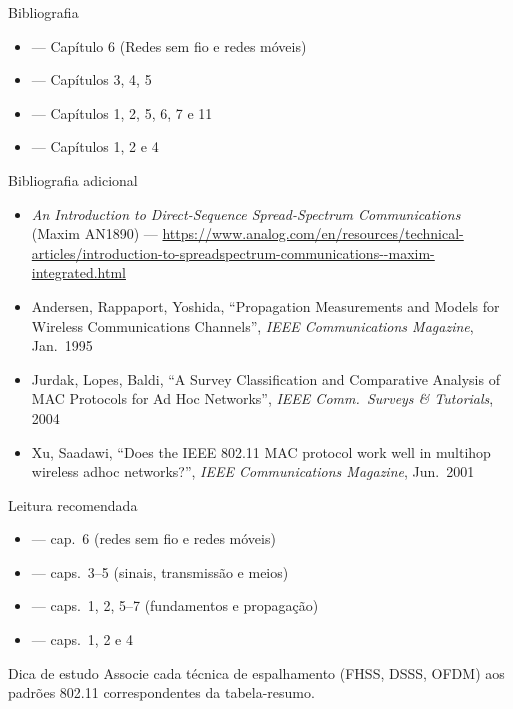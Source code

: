 \documentclass[aspectratio=169,11pt]{beamer}
\begin{document}
\begin{frame}{Bibliografia}
  \begin{itemize}
    \item \textbf{\kurose{}} --- Capítulo 6 (Redes sem fio e redes móveis)
    \item \textbf{\forouzan{}} --- Capítulos 3, 4, 5
    \item \textbf{\stallings{}} --- Capítulos 1, 2, 5, 6, 7 e 11
    \item \textbf{\tanenbaum{}} --- Capítulos 1, 2 e 4
  \end{itemize}
  \begin{block}{Bibliografia adicional}
    \begin{itemize}
      \item \emph{An Introduction to Direct-Sequence Spread-Spectrum Communications} (Maxim AN1890) --- \url{https://www.analog.com/en/resources/technical-articles/introduction-to-spreadspectrum-communications--maxim-integrated.html}
      \item Andersen, Rappaport, Yoshida, ``Propagation Measurements and Models for Wireless Communications Channels'', \emph{IEEE Communications Magazine}, Jan.~1995
      \item Jurdak, Lopes, Baldi, ``A Survey Classification and Comparative Analysis of MAC Protocols for Ad Hoc Networks'', \emph{IEEE Comm.\ Surveys \& Tutorials}, 2004
      \item Xu, Saadawi, ``Does the IEEE 802.11 MAC protocol work well in multihop wireless adhoc networks?'', \emph{IEEE Communications Magazine}, Jun.~2001
    \end{itemize}
  \end{block}
\end{frame}

\begin{frame}{Leitura recomendada}
  \begin{itemize}
    \item \textbf{\kurose{}} --- cap.~6 (redes sem fio e redes móveis)
    \item \textbf{\forouzan{}} --- caps.~3--5 (sinais, transmissão e meios)
    \item \textbf{\stallings{}} --- caps.~1, 2, 5--7 (fundamentos e propagação)
    \item \textbf{\tanenbaum{}} --- caps.~1, 2 e 4
  \end{itemize}
  \begin{exampleblock}{Dica de estudo}
    Associe cada técnica de espalhamento (FHSS, DSSS, OFDM) aos padrões 802.11 correspondentes da tabela-resumo.
  \end{exampleblock}
\end{frame}
\end{document}
